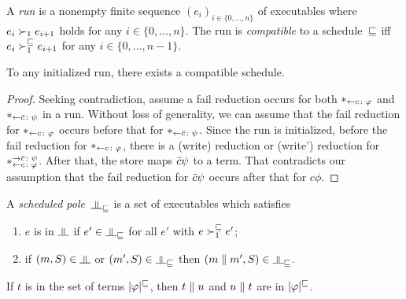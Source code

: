 A \textit{run} is a nonempty finite sequence
$(e_i)_{i\in\{0,\ldots,n\}}$ of executables where
$e_i\succ_1 e_{i+1}$ holds for any $i\in\{0,\ldots,n\}$.
The run is \textit{compatible} to a schedule~$\sqsubseteq$ iff
$e_i\succ_1^\sqsubseteq e_{i+1}$ for any $i\in\{0,\ldots,n-1\}$.

\begin{proposition}
 To any initialized run, there exists a compatible schedule.
\end{proposition}
\begin{proof}
 Seeking contradiction, assume a fail reduction occurs for both $\ast_{\leftarrow{c\colon {\varphi}}}$ and $\ast_{\leftarrow{\bar{c}\colon {\psi}}}$ in a run.
 Without loss of generality, we can assume that the fail reduction for
 $\ast_{\leftarrow{c\colon {\varphi}}}$ occurs before that for $\ast_{\leftarrow{\bar{c}\colon {\psi}}}$.
 Since the run is initialized,
 before the fail reduction for $\ast_{\leftarrow{c\colon {\varphi}}}$,
 there is a (write) reduction
 or (write') reduction for $\ast^{\rightarrow {\bar{c} \colon {\psi}}}_{\leftarrow{c\colon {\varphi}}}$.
 After that, the store maps $\bar{c}\psi$ to a term.
 That contradicts our assumption that the fail reduction for $\bar{c}\psi$
 occurs after that for $c\phi$.
\end{proof}

A \textit{scheduled pole}~$\bbot_\sche$ is a set of executables
which satisfies
\begin{enumerate}
 \item $e$ is in $\bbot$ if $e'\in\bbot_\sche$ for all
       $e'$ with $e\succ_1^\sqsubseteq e'$;
 \item if $(m,S)\in\bbot$ or $(m',S)\in\bbot_\sche$
       then $(m\conc m',S)\in\bbot_\sche$.
\end{enumerate}

\begin{proposition}
 If $t$ is in the set of terms $|{\varphi}|^\sqsubseteq$, then
 $t\parallel u$ and $u\parallel t$ are in $|{\varphi}|^\sqsubseteq$.
\end{proposition}


